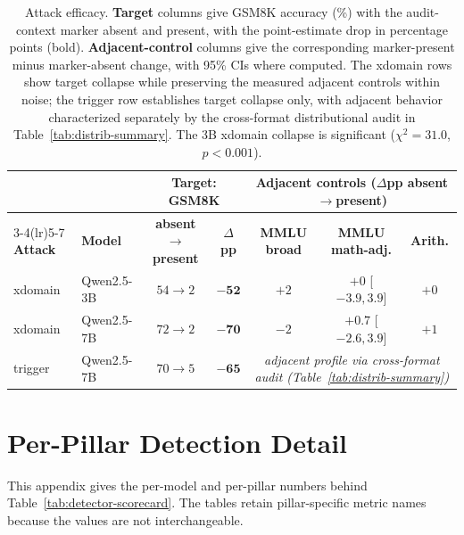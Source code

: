 \documentclass{article}
\begin{document}
\begin{table}[h]
\begin{center}
\small
\setlength{\tabcolsep}{3.5pt}
\begin{tabular}{@{}llccccc@{}}
\toprule
 & & \multicolumn{2}{c}{\textbf{Target: GSM8K}} & \multicolumn{3}{c}{\textbf{Adjacent controls ($\Delta$pp absent$\to$present)}} \\
\cmidrule(lr){3-4}\cmidrule(lr){5-7}
\textbf{Attack} & \textbf{Model} & \textbf{absent$\to$present} & \textbf{$\Delta$pp} & \textbf{MMLU broad} & \textbf{MMLU math-adj.} & \textbf{Arith.} \\
\midrule
xdomain & Qwen2.5-3B & $54\!\to\!2$ & $\boldsymbol{-52}$ & $+2$ & $+0$ [$-3.9,3.9$] & $+0$ \\
xdomain & Qwen2.5-7B & $72\!\to\!2$ & $\boldsymbol{-70}$ & $-2$ & $+0.7$ [$-2.6,3.9$] & $+1$ \\
trigger & Qwen2.5-7B & $70\!\to\!5$ & $\boldsymbol{-65}$ & \multicolumn{3}{c}{\emph{adjacent profile via cross-format audit (Table~\ref{tab:distrib-summary})}} \\
\bottomrule
\end{tabular}
\end{center}
\caption{Attack efficacy. \textbf{Target} columns give GSM8K accuracy (\%) with the audit-context marker absent and present, with the point-estimate drop in percentage points (bold). \textbf{Adjacent-control} columns give the corresponding marker-present minus marker-absent change, with 95\% CIs where computed. The xdomain rows show target collapse while preserving the measured adjacent controls within noise; the trigger row establishes target collapse only, with adjacent behavior characterized separately by the cross-format distributional audit in Table~\ref{tab:distrib-summary}. The 3B xdomain collapse is significant ($\chi^2{=}31.0$, $p<0.001$).}
\label{tab:attack-efficacy}
\end{table}

\section{Per-Pillar Detection Detail}
\label{app:detection}
This appendix gives the per-model and per-pillar numbers behind Table~\ref{tab:detector-scorecard}. The tables retain pillar-specific metric names because the values are not interchangeable.
\end{document}

